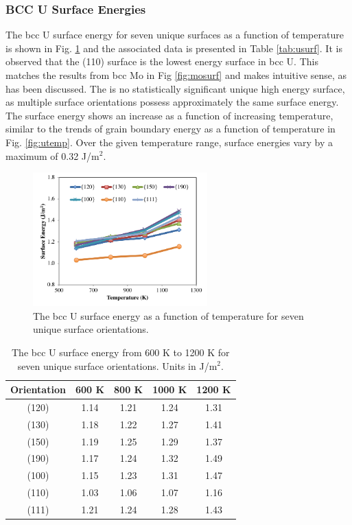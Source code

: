 \documentclass[review]{elsarticle}
\begin{document}
\FloatBarrier


\subsubsection{BCC U Surface Energies}

The bcc U surface energy for seven unique surfaces as a function of temperature is shown in Fig. \ref{fig:usurf} and the associated data is presented in Table \ref{tab:usurf}. It is observed that the (110) surface is the lowest energy surface in bcc U. This matches the results from bcc Mo in Fig \ref{fig:mosurf} and makes intuitive sense, as has been discussed. The is no statistically significant unique high energy surface, as multiple surface orientations possess approximately the same surface energy. The surface energy shows an increase as a function of increasing temperature, similar to the trends of grain boundary energy as a function of temperature in Fig. \ref{fig:utemp}. Over the given temperature range, surface energies vary by a maximum of 0.32 J/m$^{2}$.

\begin{figure}[h]
 \centering
 \includegraphics[width=0.6\textwidth]{usurf.png} 
 \caption{The bcc U surface energy as a function of temperature for seven unique surface orientations.}
 \label{fig:usurf}
\end{figure}

\begin{table}[h]
\caption{The bcc U surface energy from 600 K to 1200 K for seven unique surface orientations. Units in J/m$^{2}$. } \label{tab:usurf}
\begin{center}
\begin{tabular}{|c|c|c|c|c|}
	\hline
	Orientation & 600 K & 800 K & 1000 K & 1200 K \\
	 \hline
	 (120) & 1.14 & 1.21 & 1.24 & 1.31 \\
	 (130) & 1.18 & 1.22 & 1.27 & 1.41 \\
	 (150) & 1.19 & 1.25 & 1.29 & 1.37 \\
	 (190) & 1.17 & 1.24 & 1.32 & 1.49 \\
 (100) & 1.15 & 1.23 & 1.31 & 1.47 \\
	 (110) & 1.03 & 1.06 & 1.07 & 1.16 \\
	 (111) & 1.21 & 1.24 & 1.28 & 1.43 \\	 
	 \hline
\end{tabular}
\end{center}
\label{default}
\end{table}
\end{document}
